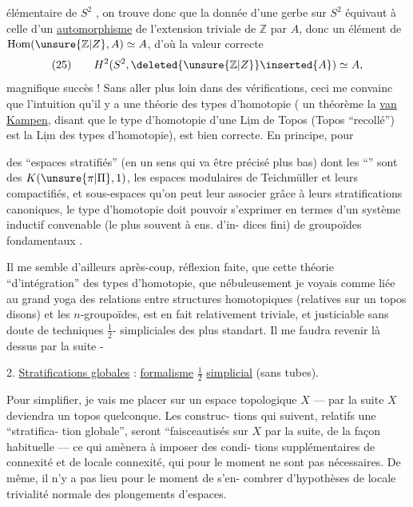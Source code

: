 élémentaire de $S^2$ , on trouve donc
que la donnée d'une gerbe sur $S^2$ équivaut
à celle d'un \uline{automorphisme} de
l'extension triviale  de $\mathbb Z$ par $A$,
donc  un élément de $\operatorname{Hom}(\unsure{\mathbb Z|Z},A)\simeq A$,
d'où la valeur correcte
\[
(25)\qquad H^2(S^2,\deleted{\unsure{\mathbb Z|Z}}\inserted{A})\simeq A,
\]
magnifique succès ! Sans aller plus
loin dans des vérifications, ceci me
convainc que l'intuition qu'il y
a une théorie des 
 types d'homotopie ( un
théorème  la \uline{van Kampen}, disant
que le type d'homotopie d'une
$\underline{\mathrm{Lim}}$ de Topos (Topos ``recollé'') est
la $\underline{\mathrm{Lim}}$ des types d'homotopie),
est bien correcte. En principe, pour

des ``espaces stratifiés'' (en un sens qui
va être précisé plus bas) dont les
``'' sont des $K(\unsure{\pi|\Pi},1)$, 
les espaces modulaires de Teichmüller
et leurs compactifiés, et  sous-espaces
qu'on peut leur associer grâce à leurs
stratifications canoniques, le type
d'homotopie doit pouvoir s'exprimer
en termes d'un système inductif
convenable (le plus souvent à ens. d'in-
dices fini) de groupoïdes fondamentaux
 .

Il me semble d'ailleurs après-coup,
réflexion faite, que cette théorie ``d'intégration''
des types d'homotopie, que nébuleusement
je voyais comme liée au grand yoga des
relations entre structures homotopiques (relatives
sur un topos disons) et les $n$-groupoïdes,
est en fait relativement triviale, et
justiciable sans doute de techniques $\frac12$-
simpliciales des plus standart. Il me
faudra revenir là dessus par la suite -

2. \uline{Stratifications globales} : \uline{formalisme} $\frac12$ \uline{simplicial}
(sans tubes).

Pour simplifier, je vais me placer sur un
espace topologique $X$ --- par la suite $X$
deviendra un topos quelconque. Les construc-
tions qui suivent, relatifs  une ``stratifica-
tion globale'', seront ``faisceautisés sur $X$
par la suite, de la façon habituelle ---
ce qui amènera  à imposer des condi-
tions supplémentaires de connexité et
de locale connexité, qui pour le moment
ne sont pas nécessaires. De même, il n'y
a pas lieu pour le moment de s'en-
combrer d'hypothèses de locale trivialité
normale des plongements d'espaces.

